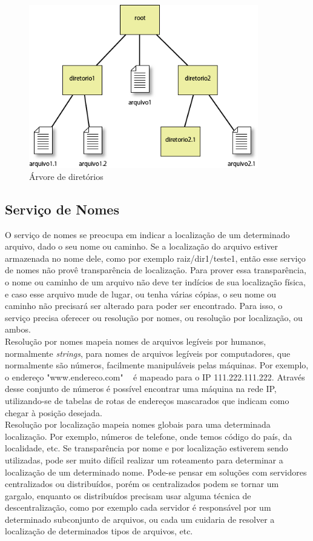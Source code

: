 	\begin{figure}[htb]
		\begin{center}
			
			\includegraphics[clip,width=10.0cm]{images/image3.png}
			\caption{Árvore de diretórios}
			\label{fig:arv_dir}
		\end{center}
	\end{figure}
	
	\subsection{Serviço de Nomes}
	O serviço de nomes se preocupa em indicar a localização de um determinado arquivo, dado o seu nome ou caminho. Se a localização do arquivo estiver armazenada no nome dele, como por exemplo raiz/dir1/teste1, então esse serviço de nomes não provê transparência de localização. Para prover essa transparência, o nome ou caminho de um arquivo não deve ter indícios de sua localização física, e caso esse arquivo mude de lugar, ou tenha várias cópias, o seu nome ou caminho não precisará
	ser alterado para poder ser encontrado. Para isso, o serviço precisa oferecer ou resolução por nomes, ou resolução por localização, ou ambos.\\
	
	Resolução por nomes mapeia nomes de arquivos legíveis por humanos, normalmente \textit{strings}, para nomes de arquivos legíveis por computadores, que normalmente são números, facilmente manipuláveis pelas máquinas. Por exemplo, o endereço "www.endereco.com" ~ é mapeado para o IP 111.222.111.222. Através desse conjunto de números é possível encontrar uma máquina na rede IP, utilizando-se de tabelas de rotas de endereços mascarados que indicam como chegar à posição desejada.\\
	
	Resolução por localização mapeia nomes globais para uma determinada localização. Por exemplo, números de telefone, onde temos código do país, da localidade, etc. Se transparência por nome e por localização estiverem sendo utilizadas, pode ser muito difícil realizar um roteamento para determinar a localização de um determinado nome. Pode-se pensar em soluções com servidores
	centralizados ou distribuídos, porém os centralizados podem se tornar um gargalo, enquanto os distribuídos precisam usar alguma técnica de descentralização, como por exemplo cada servidor é responsável por um determinado subconjunto de arquivos, ou cada um cuidaria de resolver a localização de determinados tipos de arquivos, etc.
	
		



 

	

